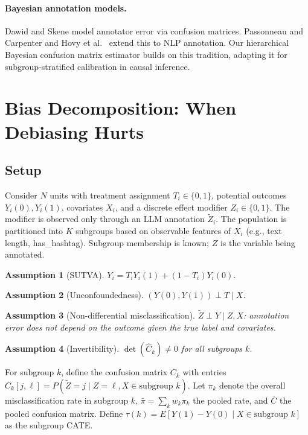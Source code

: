 \documentclass[11pt,twocolumn]{article}
\newtheorem{assumption}{Assumption}
\begin{document}
\paragraph{Bayesian annotation models.}
Dawid and Skene \cite{dawid1979} model annotator error via confusion matrices. Passonneau and Carpenter \cite{passonneau2014} and Hovy et al.\ \cite{hovy2013} extend this to NLP annotation. Our hierarchical Bayesian confusion matrix estimator builds on this tradition, adapting it for subgroup-stratified calibration in causal inference.

\section{Bias Decomposition: When Debiasing Hurts}
\label{sec:theory}

\subsection{Setup}

Consider $N$ units with treatment assignment $T_i \in \{0,1\}$, potential outcomes $Y_i(0), Y_i(1)$, covariates $X_i$, and a discrete effect modifier $Z_i \in \{0,1\}$. The modifier is observed only through an LLM annotation $\tilde{Z}_i$. The population is partitioned into $K$ subgroups based on observable features of $X_i$ (e.g., text length, has\_hashtag). Subgroup membership is known; $Z$ is the variable being annotated.

\begin{assumption}[SUTVA]
$Y_i = T_i Y_i(1) + (1-T_i) Y_i(0)$.
\end{assumption}
\begin{assumption}[Unconfoundedness]
$(Y(0), Y(1)) \perp T \mid X$.
\end{assumption}
\begin{assumption}[Non-differential misclassification]
$\tilde{Z} \perp Y \mid Z, X$: annotation error does not depend on the outcome given the true label and covariates.
\end{assumption}
\begin{assumption}[Invertibility]
$\det(\hat{C}_k) \neq 0$ for all subgroups $k$.
\end{assumption}

For subgroup $k$, define the confusion matrix $C_k$ with entries $C_k[j,\ell] = P(\tilde{Z} = j \mid Z = \ell, X \in \text{subgroup } k)$. Let $\pi_k$ denote the overall misclassification rate in subgroup $k$, $\bar{\pi} = \sum_k w_k \pi_k$ the pooled rate, and $\bar{C}$ the pooled confusion matrix. Define $\tau(k) = E[Y(1) - Y(0) \mid X \in \text{subgroup } k]$ as the subgroup CATE.
\end{document}
